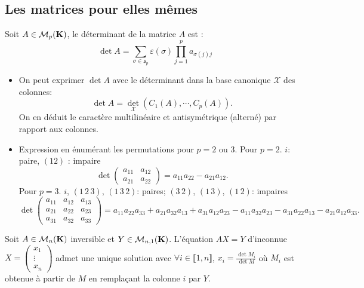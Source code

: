 \subsection{Les matrices pour elles mêmes}
\begin{defi}
 Soit $A\in\mathcal M_p(\mathbf{K})$, le déterminant de la matrice $A$ est :
\begin{displaymath}
 \det A =
\sum_{\sigma\in \mathfrak s_p}\varepsilon(\sigma)\prod_{j=1}^{p}a_{\sigma(j)j}
\end{displaymath}
\end{defi}
\begin{rems}
\begin{itemize}
  \item On peut exprimer $\det A$ avec le déterminant dans la base canonique $\mathcal{X}$ des colonnes:
\[
  \det A= \det_\mathcal{X}(C_1(A), \cdots, C_p(A)).
\]
On en déduit le caractère multilinéaire et antisymétrique (alterné) par rapport aux colonnes.
   \item Expression en énumérant les permutations pour $p=2$ ou $3$.\newline
Pour $p=2$. $i$: paire, $(1 2)$ : impaire
\[
  \det 
  \begin{pmatrix} a_{11} & a_{12} \\ a_{21} & a_{22} \end{pmatrix} = a_{11}a_{22} - a_{21}a_{12}.
\]
Pour $p=3$. $i$, $(1\, 2\, 3)$, $(1\, 3\, 2)$: paires; $(3\,2)$, $(1\,3)$, $(1\, 2)$: impaires
\[
  \det
  \begin{pmatrix}
    a_{11} & a_{12} & a_{13}\\ a_{21} & a_{22} & a_{2 3}\\ a_{31} & a_{32} & a_{3 3} 
  \end{pmatrix}
= a_{11}a_{22}a_{33} + a_{21}a_{32}a_{13} + a_{31}a_{12}a_{23} - a_{11}a_{32}a_{23} - a_{31}a_{22}a_{13} -a_{21}a_{12}a_{33}.  
\]

   
\end{itemize}

  
\end{rems}
\begin{propn}
 Soit $A\in \mathcal{M}_n(\mathbf{K})$ inversible et $Y\in \mathcal{M}_{n,1}(\mathbf{K})$. L'équation $AX = Y$ d'inconnue $X= \begin{pmatrix}x_1 \\ \vdots \\x_n\end{pmatrix}$ admet une unique solution avec $\forall i \in \llbracket 1,n \rrbracket$, $x_i = \frac{\det M_i}{\det M}$ où $M_i$ est obtenue à partir de $M$ en remplaçant la colonne $i$ par $Y$.
\end{propn}
